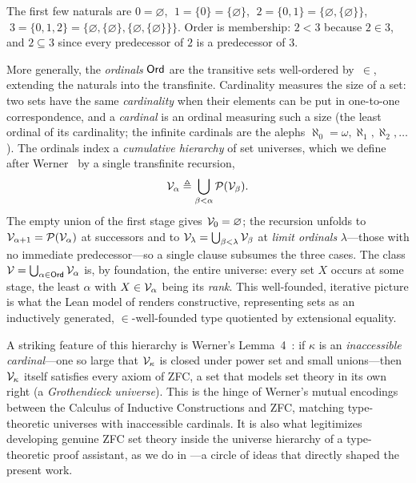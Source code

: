 \begin{example}
The first few naturals are
$0 = \varnothing$, $\;1 = \{0\} = \{\varnothing\}$, $\;2 = \{0, 1\} = \{\varnothing, \{\varnothing\}\}$, $\;3 = \{0, 1, 2\} = \{\varnothing, \{\varnothing\}, \{\varnothing, \{\varnothing\}\}\}$. Order is
membership: $2 < 3$ because $2 \in 3$, and $2 \subseteq 3$ since every
predecessor of $2$ is a predecessor of $3$.
\end{example}

More generally, the \emph{ordinals} $\mathsf{Ord}$ are the transitive sets
well-ordered by~$\in$, extending the naturals into the transfinite. Cardinality
measures the size of a set: two sets have the same \emph{cardinality} when their
elements can be put in one-to-one correspondence, and a \emph{cardinal} is an
ordinal measuring such a size (the least ordinal of its cardinality; the infinite
cardinals are the alephs $\aleph_0 = \omega, \aleph_1, \aleph_2, \dots$).
The ordinals index a \emph{cumulative hierarchy} of set universes, which we define after
Werner~\cite{werner1997sets} by a single transfinite recursion,
\[
  \mathcal{V}_\alpha \triangleq \bigcup_{\beta < \alpha} \mathcal{P}(\mathcal{V}_\beta).
\]
The empty union of the first stage gives $\mathcal{V}_0 = \varnothing$; the recursion unfolds to
$\mathcal{V}_{\alpha + 1} = \mathcal{P}(\mathcal{V}_\alpha)$ at successors and to
$\mathcal{V}_\lambda = \bigcup_{\beta < \lambda} \mathcal{V}_\beta$ at \emph{limit
ordinals} $\lambda$---those with no immediate predecessor---so a single clause
subsumes the three cases. The class $\mathcal{V} = \bigcup_{\alpha \in \mathsf{Ord}} \mathcal{V}_\alpha$ is, by foundation, the
entire universe: every set $X$ occurs at some stage, the least $\alpha$ with
$X \in \mathcal{V}_\alpha$ being its \emph{rank}\footnotemark. This well-founded, iterative picture is
what the Lean model of  renders constructive, representing sets
as an inductively generated, $\in$-well-founded type quotiented by extensional
equality.


\begin{remark}
A striking feature of this hierarchy is Werner's Lemma~4~\cite{werner1997sets}: if $\kappa$ is an
\emph{inaccessible cardinal}---one so large that $\mathcal{V}_\kappa$ is closed
under power set and small unions---then $\mathcal{V}_\kappa$ itself satisfies every
axiom of ZFC, a set that models set theory in its own right (a \emph{Grothendieck
universe}). This is the hinge of Werner's mutual encodings between the Calculus
of Inductive Constructions and ZFC, matching type-theoretic universes with
inaccessible cardinals. It is also what legitimizes
developing genuine ZFC set theory inside the universe hierarchy of a
type-theoretic proof assistant, as we do in ---a circle of ideas
that directly shaped the present work.
\end{remark}


